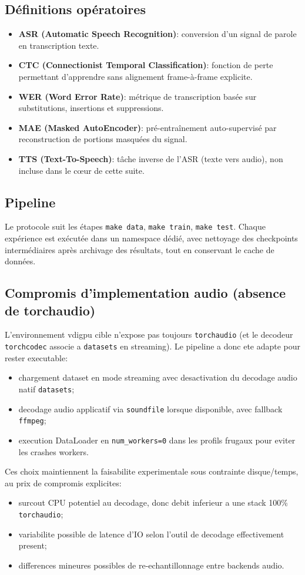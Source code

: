 \documentclass[11pt,a4paper]{article}
\begin{document}
\subsection{Définitions opératoires}
\begin{itemize}
\item \textbf{ASR (Automatic Speech Recognition)}: conversion d'un signal de parole en transcription texte.
\item \textbf{CTC (Connectionist Temporal Classification)}: fonction de perte permettant d'apprendre sans alignement frame-à-frame explicite.
\item \textbf{WER (Word Error Rate)}: métrique de transcription basée sur substitutions, insertions et suppressions.
\item \textbf{MAE (Masked AutoEncoder)}: pré-entraînement auto-supervisé par reconstruction de portions masquées du signal.
\item \textbf{TTS (Text-To-Speech)}: tâche inverse de l'ASR (texte vers audio), non incluse dans le cœur de cette suite.
\end{itemize}

\subsection{Pipeline}
Le protocole suit les étapes \texttt{make data}, \texttt{make train}, \texttt{make test}.
Chaque expérience est exécutée dans un namespace dédié, avec nettoyage des checkpoints intermédiaires après archivage des résultats, tout en conservant le cache de données.


\subsection{Compromis d'implementation audio (absence de torchaudio)}
L'environnement vdigpu cible n'expose pas toujours \texttt{torchaudio} (et le decodeur \texttt{torchcodec} associe a \texttt{datasets} en streaming).
Le pipeline a donc ete adapte pour rester executable:
\begin{itemize}
\item chargement dataset en mode streaming avec desactivation du decodage audio natif \texttt{datasets};
\item decodage audio applicatif via \texttt{soundfile} lorsque disponible, avec fallback \texttt{ffmpeg};
\item execution DataLoader en \texttt{num\_workers=0} dans les profils frugaux pour eviter les crashes workers.
\end{itemize}
Ces choix maintiennent la faisabilite experimentale sous contrainte disque/temps, au prix de compromis explicites:
\begin{itemize}
\item surcout CPU potentiel au decodage, donc debit inferieur a une stack 100\% \texttt{torchaudio};
\item variabilite possible de latence d'IO selon l'outil de decodage effectivement present;
\item differences mineures possibles de re-echantillonnage entre backends audio.
\end{itemize}
\end{document}
